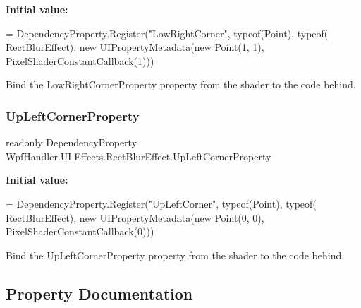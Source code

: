 {\bfseries Initial value\+:}
\begin{DoxyCode}
=
            DependencyProperty.Register(\textcolor{stringliteral}{"LowRightCorner"}, typeof(Point), typeof(
      \mbox{\hyperlink{class_wpf_handler_1_1_u_i_1_1_effects_1_1_rect_blur_effect_a2f78d40f98a923f23467fb795a1d301c}{RectBlurEffect}}),
                \textcolor{keyword}{new} UIPropertyMetadata(\textcolor{keyword}{new} Point(1, 1), PixelShaderConstantCallback(1)))
\end{DoxyCode}


Bind the Low\+Right\+Corner\+Property property from the shader to the code behind. 

\mbox{\label{class_wpf_handler_1_1_u_i_1_1_effects_1_1_rect_blur_effect_aaf9984410cb78206a63a2d56dff7b04d}} 
\subsubsection{\texorpdfstring{Up\+Left\+Corner\+Property}{UpLeftCornerProperty}}
{\footnotesize\ttfamily readonly Dependency\+Property Wpf\+Handler.\+U\+I.\+Effects.\+Rect\+Blur\+Effect.\+Up\+Left\+Corner\+Property\hspace{0.3cm}{\ttfamily [static]}}

{\bfseries Initial value\+:}
\begin{DoxyCode}
=
            DependencyProperty.Register(\textcolor{stringliteral}{"UpLeftCorner"}, typeof(Point), typeof(
      \mbox{\hyperlink{class_wpf_handler_1_1_u_i_1_1_effects_1_1_rect_blur_effect_a2f78d40f98a923f23467fb795a1d301c}{RectBlurEffect}}),
                \textcolor{keyword}{new} UIPropertyMetadata(\textcolor{keyword}{new} Point(0, 0), PixelShaderConstantCallback(0)))
\end{DoxyCode}


Bind the Up\+Left\+Corner\+Property property from the shader to the code behind. 



\subsection{Property Documentation}
\mbox{\label{class_wpf_handler_1_1_u_i_1_1_effects_1_1_rect_blur_effect_a16fb661a9b5f9f2c7a59eba0bca46198}} 
